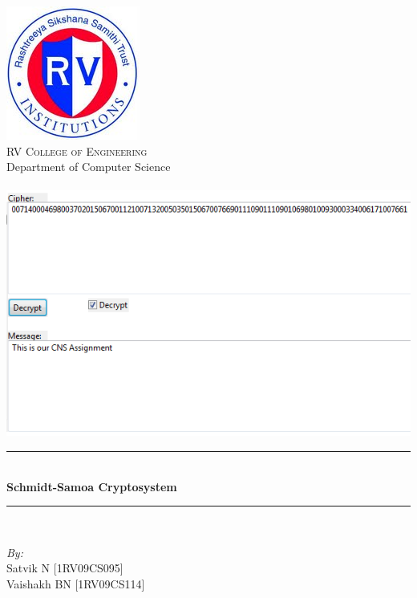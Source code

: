 \documentclass[12pt]{article} %
\newcommand{\HRule}{\rule{\linewidth}{0.5mm}}
\begin{document}
\maketitle
\begin{titlepage}

\begin{center}


\includegraphics[scale=0.75]{RVCE.png}\\[1cm]    

\textsc{\LARGE  RV College of Engineering}\\[0.5cm]
\large{Department of Computer Science}\\[1cm]
\textsc{\Large }\\[0.5cm]

\includegraphics[scale=0.75]{proj.png}\\[1cm]    

\HRule \\[0.4cm]
{  \huge\bfseries Schmidt-Samoa Cryptosystem }\\[0.4cm]

\HRule \\[1cm]

\begin{minipage}{0.8\textwidth}
\begin{flushleft} \large
\emph{By:}\\
Satvik \textsc{N} [1RV09CS095]\\
Vaishakh \textsc{BN} [1RV09CS114]\\

\end{flushleft}
\end{minipage}
\vfill

{\large}

\end{center}

\end{titlepage}
\end{document}
